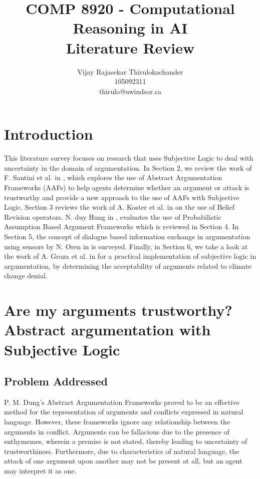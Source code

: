 \documentclass[UTF8]{article}
\begin{document}
\title{%
    COMP 8920 - Computational Reasoning in AI \\
  \large Literature Review \\}

\author{%
    Vijay Rajasekar Thirulokachander\\
    105092311\\
    \large thirulo@uwindsor.ca}
\date{}
\maketitle

\section{Introduction}
This literature survey focuses on research that uses Subjective Logic to deal with uncertainty in the domain of argumentation. 
In Section 2, we review the work of F. Santini et al. in \cite{8455455}, which explores the use of Abstract Argumentation Frameworks (AAFs) to help agents determine whether an argument or attack 
is trustworthy and provide a new approach to the use of AAFs with Subjective Logic. Section 3 reviews the work of A. Koster et al. in \cite{Koster2017} on the use of Belief Revision operators. 
N. duy Hung in \cite{8023355}, evaluates the use of Probabilistic Assumption Based Argument Frameworks which is reviewed in Section 4.  In Section 5, the concept of 
dialogue based information exchange in argumentation using sensors by N. Oren in \cite{OREN2007838} is surveyed. Finally, in Section 6, we take a look 
at the work of A. Groza et al. in \cite{8516616} for a practical implementation of subjective logic in argumentation, by determining the acceptability of arguments related to climate change denial.

\section{Are my arguments trustworthy? Abstract argumentation with Subjective Logic}
\subsection{Problem Addressed}
P. M. Dung's Abstract Argumentation Frameworks\cite{DUNG1995321} proved to be an effective method for the 
representation of arguments and conflicts expressed in natural language. However, these frameworks ignore any 
relationship between the arguments in conflict. Arguments can be fallacious due to the presence of enthymemes, 
wherein a premise is not stated, thereby leading to uncertainty of trustworthiness. 
Furthermore, due to characteristics of natural language, the attack of one argument upon another may not be present at all, but an agent may interpret it as one. 
\end{document}

